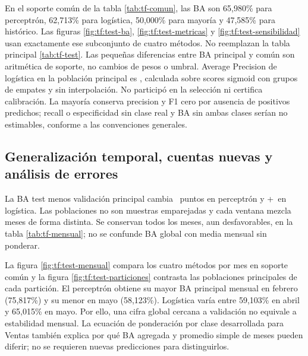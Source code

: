 
En el soporte común de la tabla \ref{tab:tf-comun}, las BA son 65,980\% para perceptrón, 62,713\% para logística, 50,000\% para mayoría y 47,585\% para histórico. Las figuras \ref{fig:tf:test-ba}, \ref{fig:tf:test-metricas} y \ref{fig:tf:test-sensibilidad} usan exactamente ese subconjunto de cuatro métodos. No reemplazan la tabla principal \ref{tab:tf-test}. Las pequeñas diferencias entre BA principal y común son aritmética de soporte, no cambios de pesos o umbral.
Average Precision de logística en la población principal es \TFLogAPTest, calculada sobre scores sigmoid con grupos de empates y sin interpolación. No participó en la selección ni certifica calibración. La mayoría conserva precision y F1 cero por ausencia de positivos predichos; recall o especificidad sin clase real y BA sin ambas clases serían no estimables, conforme a las convenciones generales.

\subsection{Generalización temporal, cuentas nuevas y análisis de errores}
La BA test menos validación principal cambia \TFDeltaBAP\ puntos en perceptrón y +\TFDeltaBAL\ en logística. Las poblaciones no son muestras emparejadas y cada ventana mezcla meses de forma distinta. Se conservan todos los meses, aun desfavorables, en la tabla \ref{tab:tf-mensual}; no se confunde BA global con media mensual sin ponderar.

La figura \ref{fig:tf:test-mensual} compara los cuatro métodos por mes en soporte común y la figura \ref{fig:tf:test-particiones} contrasta las poblaciones principales de cada partición. El perceptrón obtiene su mayor BA principal mensual en febrero (75,817\%) y su menor en mayo (58,123\%). Logística varía entre 59,103\% en abril y 65,015\% en mayo. Por ello, una cifra global cercana a validación no equivale a estabilidad mensual. La ecuación de ponderación por clase desarrollada para Ventas también explica por qué BA agregada y promedio simple de meses pueden diferir; no se requieren nuevas predicciones para distinguirlos.

